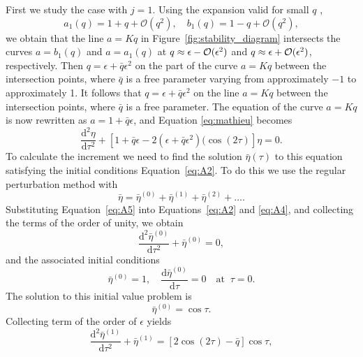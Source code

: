 First we study the case with $j = 1$. Using the expansion valid for small $q$ \citep{Abramowitz1965},
%
\begin{equation}
\label{eq:A3}
a_1(q) = 1 + q + \mathcal{O}(q^2), \quad b_1(q) = 1 - q + \mathcal{O}(q^2),
\end{equation}
%
we obtain that the line $a = Kq$ in Figure~\ref{fig:stability_diagram} intersects the curves $a = b_1(q)$ and $a = a_1(q)$ at $q \approx \epsilon - {\cal O}(\epsilon^2)$ and $q \approx \epsilon + {\cal O}(\epsilon^2)$, respectively.
Then $q = \epsilon + \bar q\epsilon^2$ on the part of the curve $a = Kq$ between the intersection points, where $\bar q$ is a free parameter varying from approximately $-1$ to approximately 1.
It follows that $q = \epsilon + \bar q \epsilon^2$ on the line $a = K q$ between the intersection points, where $\bar q$ is a free parameter.
The equation of the curve $a = Kq$ is now rewritten as $a = 1 + \bar q\epsilon$\/, and Equation \eqref{eq:mathieu} becomes
%
\begin{equation}
\frac{\mathrm{d}^2 \eta}{\mathrm{d}\tau^2} + [1 + \bar q\epsilon
- 2(\epsilon + \bar q\epsilon^2)(\cos(2 \tau)] \eta = 0.
\label{eq:A4} 
\end{equation}
%
To calculate the increment we need to find the solution $\bar\eta(\tau)$ to this equation satisfying the initial conditions Equation~\eqref{eq:A2}.
To do this we use the regular perturbation method with
%
\begin{equation}
\bar\eta = \bar\eta^{(0)} + \bar\eta^{(1)} + \bar\eta^{(2)} + \dots.
\label{eq:A5} 
\end{equation}
%
Substituting Equation~\eqref{eq:A5} into Equations~\eqref{eq:A2} and \eqref{eq:A4}, and collecting the terms of the order of unity, we obtain
%
\begin{equation}
\frac{\mathrm{d}^2\bar\eta^{(0)}}{\mathrm{d}\tau^2} + \bar\eta^{(0)} = 0,
\label{eq:A6} 
\end{equation}
%
and the associated initial conditions
%
\begin{equation}
\bar\eta^{(0)} = 1, \quad \frac{\mathrm{d} \bar\eta^{(0)}}{\mathrm{d} \tau} = 0
\quad \mbox{at} \;\; \tau = 0.
\label{eq:A7} 
\end{equation}
%
The solution to this initial value problem is
% 
\begin{equation}
\bar\eta^{(0)} = \cos\tau.
\label{eq:A8}
\end{equation}
%
Collecting term of the order of $\epsilon$ yields
%
\begin{equation}
\frac{\mathrm{d}^2\bar\eta^{(1)}}{\mathrm{d}\tau^2} + \bar\eta^{(1)} = 
   [2\cos(2\tau) - \bar q]\cos\tau ,
\label{eq:A9} 
\end{equation}
